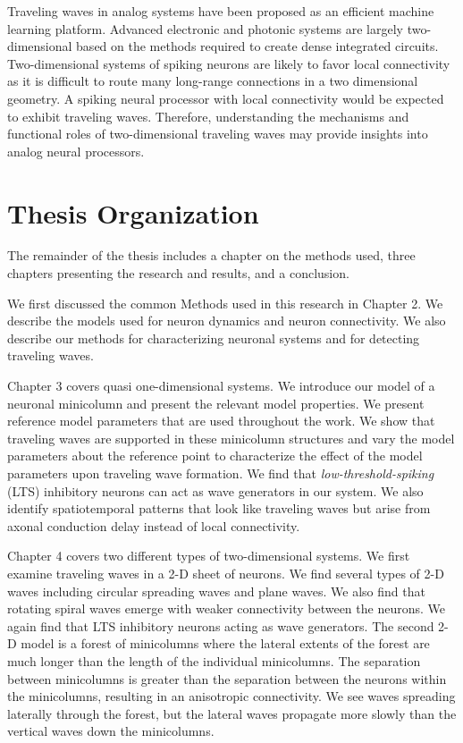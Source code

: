 Traveling waves in analog systems have been proposed as an efficient machine learning platform\citep{Hughes2019}.
Advanced electronic and photonic systems are largely two-dimensional based on the methods required to create dense integrated circuits.
Two-dimensional systems of spiking neurons are likely to favor local connectivity as it is difficult to route many long-range connections in a two dimensional geometry.
A spiking neural processor with local connectivity would be expected to exhibit traveling waves.
Therefore, understanding the mechanisms and functional roles of two-dimensional traveling waves may provide insights into analog neural processors.

\section{Thesis Organization}
The remainder of the thesis includes a chapter on the methods used, three chapters presenting the research and results, and a conclusion.

We first discussed the common Methods used in this research in Chapter 2.
We describe the models used for neuron dynamics and neuron connectivity.
We also describe our methods for characterizing neuronal systems and for detecting traveling waves.

Chapter 3 covers quasi one-dimensional systems. 
We introduce our model of a neuronal minicolumn and present the relevant model properties.
We present reference model parameters  that are used throughout the work.
We show that traveling waves are supported in these minicolumn structures and vary the model parameters about the reference point 
to characterize the effect of the model parameters upon traveling wave formation.
We find that \textit{low-threshold-spiking} (LTS) inhibitory neurons can act as wave generators in our system.
We also identify spatiotemporal patterns that look like traveling waves but arise from axonal conduction delay instead of local connectivity.

Chapter 4 covers two different types of two-dimensional systems.
We first examine traveling waves in a 2-D sheet of neurons.
We find several types of 2-D waves including circular spreading waves and plane waves.
We also find that rotating spiral waves emerge with weaker connectivity between the neurons.
We again find that LTS inhibitory neurons acting as wave generators.
The second 2-D model is a forest of minicolumns where the lateral extents of the forest are much longer than the length of the individual minicolumns.
The separation between minicolumns is greater than the separation between the neurons within the minicolumns,
resulting in an anisotropic connectivity.
We see waves spreading laterally through the forest, but the lateral waves propagate more slowly than the vertical waves down the minicolumns.


